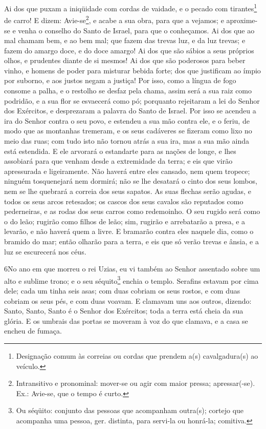 Ai dos que puxam a iniqüidade com cordas de vaidade, e o pecado
com tirantes\footnote{Designação comum às correias ou cordas que
prendem a(s) cavalgadura(s) ao veículo.} de carro! E dizem:
Avie-se\footnote{Intransitivo e pronominal: mover-se ou agir com
maior pressa; apressar(-se). Ex.: Avie-se, que o tempo é curto.}, e
acabe a sua obra, para que a vejamos; e aproxime-se e venha o
conselho do Santo de Israel, para que o conheçamos. Ai dos
que ao mal chamam bem, e ao bem mal; que fazem das trevas luz, e da
luz trevas; e fazem do amargo doce, e do doce amargo! Ai dos
que são sábios a seus próprios olhos, e prudentes diante de si
mesmos! Ai dos que são poderosos para beber vinho, e homens
de poder para misturar bebida forte; dos que justificam ao
ímpio por suborno, e aos justos negam a justiça! Por isso,
como a língua de fogo consome a palha, e o restolho se desfaz pela
chama, assim será a sua raiz como podridão, e a sua flor se
esvaecerá como pó; porquanto rejeitaram a lei do Senhor dos
Exércitos, e desprezaram a palavra do Santo de Israel. Por
isso se acendeu a ira do Senhor contra o seu povo, e estendeu a sua
mão contra ele, e o feriu, de modo que as montanhas tremeram, e os
seus cadáveres se fizeram como lixo no meio das ruas; com tudo isto
não tornou atrás a sua ira, mas a sua mão ainda está estendida.
E ele arvorará o estandarte para as nações de longe, e lhes
assobiará para que venham desde a extremidade da terra; e eis que
virão apressurada e ligeiramente. Não haverá entre eles
cansado, nem quem tropece; ninguém tosquenejará nem dormirá; não se
lhe desatará o cinto dos seus lombos, nem se lhe quebrará a correia
dos seus sapatos. As suas flechas serão agudas, e todos os
seus arcos retesados; os cascos dos seus cavalos são reputados como
pederneiras, e as rodas dos seus carros como redemoinho. O
seu rugido será como o do leão; rugirão como filhos de leão; sim,
rugirão e arrebatarão a presa, e a levarão, e não haverá quem a
livre. E bramarão contra eles naquele dia, como o bramido do
mar; então olharão para a terra, e eis que só verão trevas e ânsia,
e a luz se escurecerá nos céus.

\medskip

\lettrine{6}{}No ano em que morreu o rei Uzias, eu vi também ao
Senhor assentado sobre um alto e sublime trono; e o seu
séquito\footnote{Ou séqüito: conjunto das pessoas que acompanham
outra(s); cortejo que acompanha uma pessoa, ger. distinta, para
servi-la ou honrá-la; comitiva.} enchia o templo. Serafins
estavam por cima dele; cada um tinha seis asas; com duas cobriam os
seus rostos, e com duas cobriam os seus pés, e com duas voavam.
E clamavam uns aos outros, dizendo: Santo, Santo, Santo é o
Senhor dos Exércitos; toda a terra está cheia da sua glória. E
os umbrais das portas se moveram à voz do que clamava, e a casa se
encheu de fumaça.

